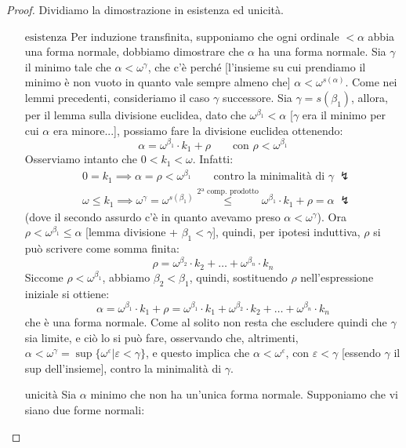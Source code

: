\documentclass[11pt]{scrartcl}
\begin{document}
\begin{proof}
	Dividiamo la dimostrazione in esistenza ed unicità.
	\begin{itemize}
		\item[$\boxed{\text{esistenza}}$] Per induzione transfinita, supponiamo che ogni ordinale $< \alpha$ abbia una forma normale, dobbiamo dimostrare che $\alpha$ ha una forma normale. Sia $\gamma$ il minimo tale che 
		$\alpha < \omega^\gamma$, che c'è perché [l'insieme su cui prendiamo il minimo è non vuoto in quanto vale sempre almeno che] $\alpha < \omega^{s(\alpha)}$. Come nei lemmi precedenti, consideriamo il caso $\gamma$ successore.
		Sia $\gamma = s(\beta_1)$, allora, per il lemma sulla divisione euclidea, dato che $\omega^{\beta_1} < \alpha$ [$\gamma$ era il minimo per cui $\alpha$ era minore...], possiamo fare la divisione euclidea ottenendo:
		\[ \alpha = \omega^{\beta_1} \cdot k_1 + \rho \qquad \text{con $\rho < \omega^{\beta_1}$}
			\]
		Osserviamo intanto che $0 < k_1 < \omega$. Infatti:
		\begin{align*}
			& 0 = k_1 \implies \alpha = \rho < \omega^{\beta_1} \qquad \text{contro la minimalità di $\gamma\;\lightning$} \\
			& \omega \leq k_1 \implies \omega^{\gamma} = \omega^{s(\beta_1)} \overset{\text{2ª comp. prodotto}}{\leq} \omega^{\beta_1} \cdot k_1 + \rho = \alpha \; \lightning
		\end{align*}
		(dove il secondo assurdo c'è in quanto avevamo preso $\alpha < \omega^\gamma$). Ora $\rho < \omega^{\beta_1} \leq \alpha$ [lemma divisione + $\beta_1<\gamma$], quindi, per ipotesi induttiva, $\rho$ si può scrivere come somma finita:
		\[ \rho = \omega^{\beta_2} \cdot k_2 + \ldots + \omega^{\beta_n} \cdot k_n
			\]
		Siccome $\rho < \omega^{\beta_1}$, abbiamo $\beta_2 < \beta_1$, quindi, sostituendo $\rho$ nell'espressione iniziale si ottiene:
		\[ \alpha = \omega^{\beta_1} \cdot k_1 + \rho = \omega^{\beta_1} \cdot k_1 + \omega^{\beta_2} \cdot k_2 + \ldots + \omega^{\beta_n} \cdot k_n
			\]
		che è una forma normale. Come al solito non resta che escludere quindi che $\gamma$ sia limite, e ciò lo si può fare, osservando che, altrimenti, $\alpha < \omega^\gamma = \sup\{\omega^{\varepsilon} | \varepsilon < \gamma\}$, e questo implica che $\alpha < \omega^{\varepsilon}$, con $\varepsilon < \gamma$ [essendo $\gamma$ il 
		sup dell'insieme], contro la minimalità di $\gamma$.
		\item[$\boxed{\text{unicità}}$] Sia $\alpha$ minimo che non ha un'unica forma normale. Supponiamo che vi siano due forme normali:

\end{itemize}
\end{proof}
\end{document}
